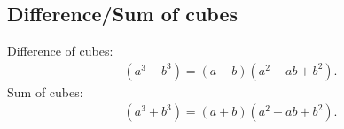 \documentclass{report}
\begin{document}
    \bigbreak \noindent \bigbreak \noindent
    \subsection{Difference/Sum of cubes}
    Difference of cubes:
    \begin{align*}
        (a^{3}-b^{3}) = (a-b)(a^{2}+ab+b^{2}) 
    .\end{align*}
    \bigbreak \noindent 
    Sum of cubes:
    \begin{align*}
        (a^{3} + b^{3}) = (a+b)(a^{2}-ab + b^{2})
    .\end{align*}


    
\end{document}
